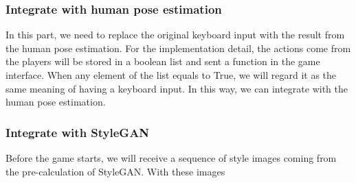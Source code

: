 \subsubsection{Integrate with human pose estimation}

In this part, we need to replace the original keyboard input with the result from the human pose estimation. For the implementation detail, the actions come from the players will be stored in a boolean list and sent a function in the game interface. When any element of the list equals to True, we will regard it as the same meaning of having a keyboard input. In this way, we can integrate with the human pose estimation.

\subsubsection{Integrate with StyleGAN}
Before the game starts, we will receive a sequence of style images coming from the pre-calculation of StyleGAN. With these images
